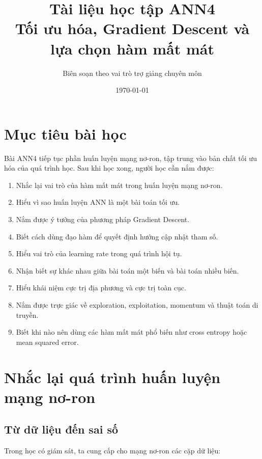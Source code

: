 \documentclass[12pt,a4paper]{report}
\title{
    \textbf{Tài liệu học tập ANN4}\\
    \large Tối ưu hóa, Gradient Descent và lựa chọn hàm mất mát
}
\author{Biên soạn theo vai trò trợ giảng chuyên môn}
\date{\today}
\begin{document}
\maketitle
\tableofcontents
\newpage

\chapter*{Mục tiêu bài học}

Bài ANN4 tiếp tục phần huấn luyện mạng nơ-ron, tập trung vào bản chất tối ưu hóa của quá trình học. Sau khi học xong, người học cần nắm được:

\begin{enumerate}[label=\arabic*.]
    \item Nhắc lại vai trò của hàm mất mát trong huấn luyện mạng nơ-ron.
    \item Hiểu vì sao huấn luyện ANN là một bài toán tối ưu.
    \item Nắm được ý tưởng của phương pháp Gradient Descent.
    \item Biết cách dùng đạo hàm để quyết định hướng cập nhật tham số.
    \item Hiểu vai trò của learning rate trong quá trình hội tụ.
    \item Nhận biết sự khác nhau giữa bài toán một biến và bài toán nhiều biến.
    \item Hiểu khái niệm cực trị địa phương và cực trị toàn cục.
    \item Nắm được trực giác về exploration, exploitation, momentum và thuật toán di truyền.
    \item Biết khi nào nên dùng các hàm mất mát phổ biến như cross entropy hoặc mean squared error.
\end{enumerate}

\chapter{Nhắc lại quá trình huấn luyện mạng nơ-ron}

\section{Từ dữ liệu đến sai số}

Trong học có giám sát, ta cung cấp cho mạng nơ-ron các cặp dữ liệu:
\end{document}
